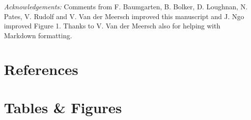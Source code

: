 \documentclass[11pt]{article}
\begin{document}

\emph{Acknowledgements:} Comments from F. Baumgarten, B. Bolker, D. Loughnan, N. Pates, V. Rudolf and V. Van der Meersch improved this manuscript and J. Ngo improved Figure 1. Thanks to V. Van der Meersch also for helping with Markdown formatting. %

\newpage
\section*{References}
\vspace{-5ex}


\clearpage

\section*{Tables \& Figures}
\end{document}
